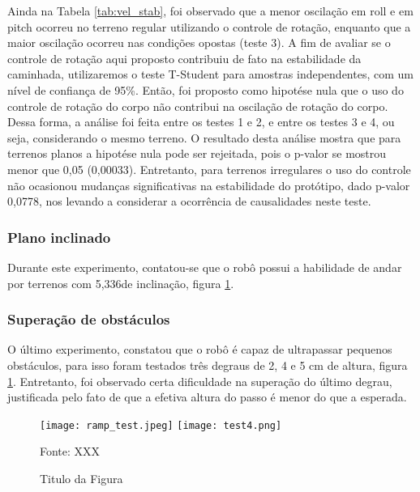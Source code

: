 \documentclass[../main.tex]{subfiles}
\begin{document}
  Ainda na Tabela \ref{tab:vel_stab}, foi observado que a menor oscilação em roll e em pitch ocorreu no terreno regular utilizando o controle de rotação, enquanto que a maior oscilação ocorreu nas condições opostas (teste 3). A fim de avaliar se o controle de rotação aqui proposto contribuiu de fato na estabilidade da caminhada, utilizaremos o teste T-Student para amostras independentes, com um nível de confiança de 95\%. Então, foi proposto como hipotése nula que o uso do controle de rotação do corpo não contribui na oscilação de rotação do corpo. Dessa forma, a análise foi feita entre os testes 1 e 2, e entre os testes 3 e 4, ou seja, considerando o mesmo terreno. O resultado desta análise mostra que para terrenos planos a hipotése nula pode ser rejeitada, pois o p-valor se mostrou menor que 0,05 (0,00033). Entretanto, para terrenos irregulares o uso do controle não ocasionou mudanças significativas na estabilidade do protótipo, dado p-valor 0,0778, nos levando a considerar a ocorrência de causalidades neste teste. 
    
  \subsubsection{Plano inclinado}
  Durante este experimento, contatou-se que o robô possui a habilidade de andar por terrenos com 5,336\degree de inclinação, figura \ref{fig:tests3-4}. 

  \subsubsection{Superação de obstáculos}
  O último experimento, constatou que o robô é capaz de ultrapassar pequenos obstáculos, para isso foram testados três degraus de 2, 4 e 5 cm de altura, figura \ref{fig:tests3-4}. Entretanto, foi observado certa dificuldade na superação do último degrau, justificada pelo fato de que a efetiva altura do passo é menor do que a esperada.

  \begin{figure}[h]
    \centering
    \caption{Titulo da Figura}
    \texttt{[image: ramp\_test.jpeg]}
    \texttt{[image: test4.png]}

    Fonte: XXX
    \label{fig:tests3-4}
  \end{figure}

   
\end{document}
